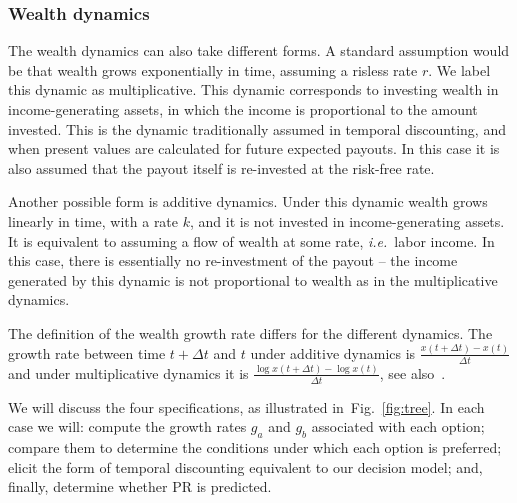 \documentclass[11pt]{article}
\newcommand{\ie}{{\it i.e.}\ }
\newcommand{\fref}[1]{Fig.~\ref{fig:#1}}
\newcommand{\Dt}{\Delta t}
\numberwithin{equation}{section}
\begin{document}

\subsubsection{Wealth dynamics}

The wealth dynamics can also take different forms. A standard assumption would be that wealth grows exponentially in time, assuming a risless rate $r$. We label this dynamic as multiplicative. This dynamic corresponds to investing wealth in income-generating assets, in which the income is proportional to the amount invested. This is the dynamic traditionally assumed in temporal discounting, and when present values are calculated for future expected payouts. In this case it is also assumed that the payout itself is re-invested at the risk-free rate.

Another possible form is additive dynamics. Under this dynamic wealth grows linearly in time, with a rate $k$, and it is not invested in income-generating assets. It is equivalent to assuming a flow of wealth at some rate, \ie labor income. In this case, there is essentially no re-investment of the payout -- the income generated by this dynamic is not proportional to wealth as in the multiplicative dynamics.

The definition of the wealth growth rate differs for the different dynamics. The growth rate between time $t+\Dt$ and $t$ under additive dynamics is $\frac{x\left(t+\Dt\right)-x\left(t\right)}{\Dt}$ and under multiplicative dynamics it is $\frac{\log x(t+\Dt)-\log x(t)}{\Dt}$, see also~\citep{peters2016evaluating,peters2018time}.

We will discuss the four specifications, as illustrated in~\fref{tree}. In each case we will: compute the growth rates $g_a$ and $g_b$ associated with each option; compare them to determine the conditions under which each option is preferred; elicit the form of temporal discounting equivalent to our decision model; and, finally, determine whether PR is predicted.
\end{document}
